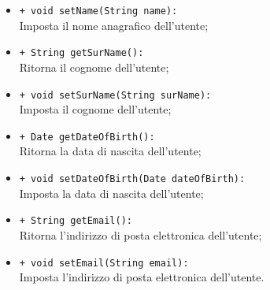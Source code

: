 \begin{flushleft}
\begin{itemize}
\begin{sloppypar}
\begin{itemize}
\item \texttt{+ void setName(String name):}\\ Imposta il nome anagrafico dell'utente;
\item \texttt{+ String getSurName():}\\ Ritorna il cognome dell'utente;
\item \texttt{+ void setSurName(String surName):}\\ Imposta il cognome dell'utente;
\item \texttt{+ Date getDateOfBirth():}\\ Ritorna la data di nascita dell'utente;
\item \texttt{+ void setDateOfBirth(Date dateOfBirth):}\\ Imposta la data di nascita dell'utente;
\item \texttt{+ String getEmail():}\\ Ritorna l'indirizzo di posta elettronica dell'utente;
\item \texttt{+ void setEmail(String email):}\\ Imposta l'indirizzo di posta elettronica dell'utente.
\end{itemize}
\end{sloppypar}
\end{itemize}
\end{flushleft}

